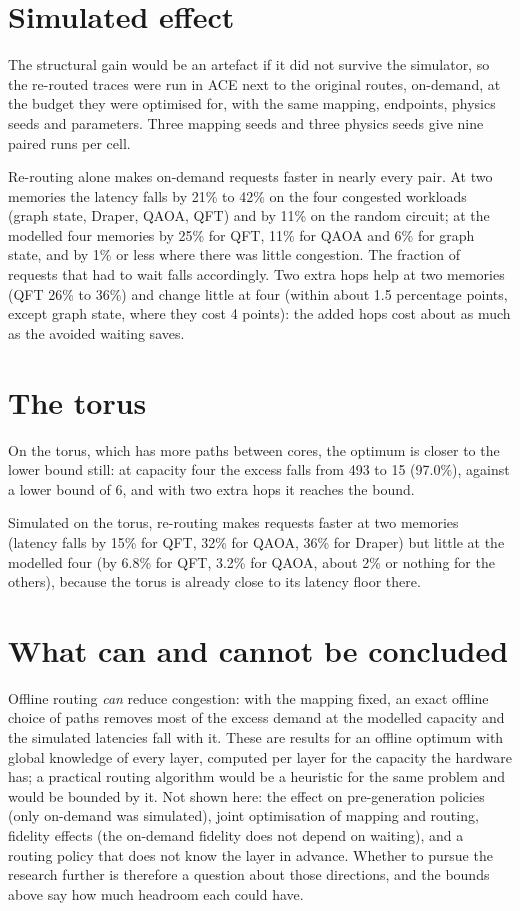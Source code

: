 \section{Simulated effect}
The structural gain would be an artefact if it did not survive the simulator, so the re-routed traces were run in ACE next to the original routes, on-demand, at the budget they were optimised for, with the same
mapping, endpoints, physics seeds and parameters. Three mapping seeds and three physics seeds give nine paired runs per cell.

Re-routing alone makes on-demand requests faster in nearly every pair. At two memories the latency falls by 21\% to 42\% on the four congested workloads (graph state, Draper, QAOA, QFT) and by 11\% on the random circuit; at the modelled four memories by 25\% for QFT, 11\% for QAOA and 6\% for graph state,
and by 1\% or less where there was little congestion. The fraction of requests that had to wait falls accordingly. Two extra hops help at two memories (QFT 26\% to 36\%) and change little at four (within about 1.5 percentage points, except graph state, where they cost 4 points): the added hops cost about as much as the avoided waiting saves.

\section{The torus}
On the torus, which has more paths between cores, the optimum is closer to the lower bound still: at capacity four the excess falls from 493 to 15 (97.0\%), against a lower bound of 6, and with two extra hops it reaches the bound.

Simulated on the torus, re-routing makes requests faster at two memories (latency falls by 15\% for QFT, 32\% for QAOA, 36\% for Draper) but little at the modelled four (by 6.8\% for QFT, 3.2\% for QAOA, about 2\% or nothing for the others), because the torus is already close to its latency floor there.


\section{What can and cannot be concluded}
Offline routing \emph{can} reduce congestion: with the mapping fixed, an exact offline choice of paths removes most of the excess demand at the modelled capacity and the simulated latencies fall with it. These
are results for an offline optimum with global knowledge of every layer, computed per layer for the capacity the hardware has; a practical routing algorithm would be a heuristic for the same problem and would be bounded by it.
Not shown here: the effect on pre-generation policies (only on-demand was simulated), joint optimisation of mapping and routing, fidelity effects (the on-demand fidelity does not depend on waiting), and a routing policy that does not know
the layer in advance. Whether to pursue the research further is therefore a question about those directions, and the bounds above say how much headroom each could have.
